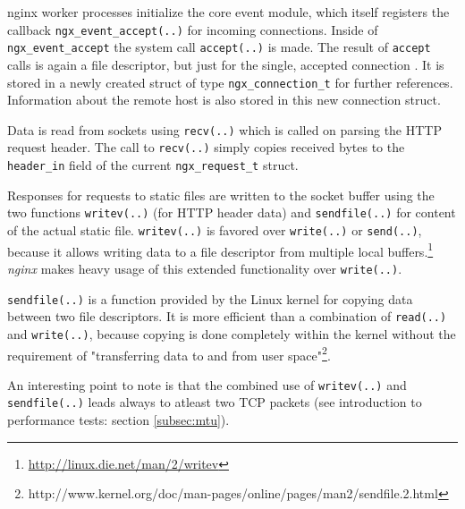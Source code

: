 nginx worker processes initialize the core event module, which itself registers the callback \texttt{ngx\_event\_accept(..)} for incoming connections. Inside of \texttt{ngx\_event\_accept} the system call \texttt{accept(..)} is made. The result of \texttt{accept} calls is again a file descriptor, but just for the single, accepted connection \cite{beejs}. It is stored in a newly created struct of type \texttt{ngx\_connection\_t} for further references. Information about the remote host is also stored in this new connection struct.

Data is read from sockets using \texttt{recv(..)} which is called on parsing the HTTP request header. The call to \texttt{recv(..)} simply copies received bytes to the \texttt{header\_in} field of the current \texttt{ngx\_request\_t} struct.

Responses for requests to static files are written to the socket buffer using the two functions \texttt{writev(..)} (for HTTP header data) and \texttt{sendfile(..)} for content of the actual static file. \texttt{writev(..)} is favored over \texttt{write(..)} or \texttt{send(..)}, because it allows writing data to a file descriptor from multiple local buffers.\footnote{\url{http://linux.die.net/man/2/writev}} \textit{nginx} makes heavy usage of this extended functionality over \texttt{write(..)}. 

\texttt{sendfile(..)} is a function provided by the Linux kernel for copying data between two file descriptors. It is more efficient than a combination of \texttt{read(..)} and \texttt{write(..)}, because copying is done completely within the kernel without the requirement of "transferring data to and from user space"\footnote{http://www.kernel.org/doc/man-pages/online/pages/man2/sendfile.2.html}.

An interesting point to note is that the combined use of \texttt{writev(..)} and \texttt{sendfile(..)} leads always to atleast two TCP packets (see introduction to performance tests: section \ref{subsec:mtu}).
